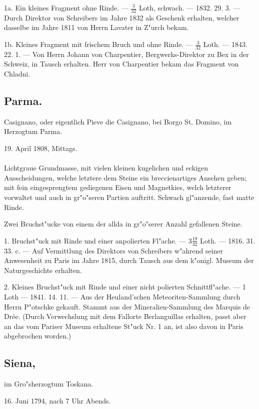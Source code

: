\documentclass[a4paper, 11pt, oneside, polutonikogreek, german]{article}
\begin{document}
1a. Ein kleines Fragment ohne Rinde. --- $\frac{3}{32}$ Loth, schwach. --- 1832. 29. 3. --- Durch Direktor von Schreibers im Jahre 1832 als Geschenk erhalten, welcher dasselbe im Jahre 1811 von Herrn Lavater in Z"urch bekam.

1b. Kleines Fragment mit frischem Bruch und ohne Rinde. --- $\frac{3}{32}$ Loth. --- 1843. 22. 1. --- Von Herrn Johann von Charpentier, Bergwerks-Direktor zu Bex in der Schweiz, in Tausch erhalten. Herr von Charpentier bekam das Fragment von Chladni.
\subsection{Parma.}
\begin{center}
\small
Casignano, oder eigentlich Pieve die Casignano, bei Borgo St. Domino, im Herzogtum Parma.

19. April 1808, Mittags.
\end{center}
\paragraph{}
Lichtgraue Grundmasse, mit vielen kleinen kugelichen und eckigen Ausscheidungen, welche letztere dem Steine ein breccienartiges Ansehen geben; mit fein eingesprengtem gediegenen Eisen und Magnetkies, welch letzterer vorwaltet und auch in gr"o"seren Partien auftritt. Schwach gl"anzende, fast matte Rinde.

Zwei Bruchst"ucke von einem der allda in gr"o"serer Anzahl gefallenen Steine.

1. Bruchst"uck mit Rinde und einer anpolierten Fl"ache. --- $3\frac{19}{32}$ Loth. --- 1816. 31. 33. c. --- Auf Vermittlung des Direktors von Schreibers w"ahrend seiner Anwesenheit zu Paris im Jahre 1815, durch Tausch aus dem k"onigl. Museum der Naturgeschichte erhalten.

2. Kleines Bruchst"uck mit Rinde und einer nicht polierten Schnittfl"ache. --- 1 Loth --- 1841. 14. 11. --- Aus der Heuland'schen Meteoriten-Sammlung durch Herrn P"otschke gekauft. Stammt aus der Mineralien-Sammlung des Marquis de Drée. (Durch Verwechslung mit dem Fallorte Berlanguillas erhalten, passt aber an das vom Pariser Museum erhaltene St"uck Nr. 1 an, ist also davon in Paris abgebrochen worden.)
\subsection[Siena.]{Siena,}
\begin{center}
\small
im Gro"sherzogtum Toskana.

16. Juni 1794, nach 7 Uhr Abends.
\end{center}
\end{document}
